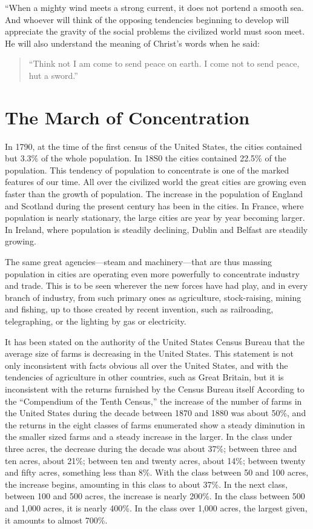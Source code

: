 \documentclass{book}
\begin{document}
“When a mighty wind meets a strong current, it does not portend a smooth sea. And whoever will think of the opposing tendencies beginning to develop will appreciate the gravity of the social problems the civilized world must soon meet. He will also understand the meaning of Christ’s words when he said:

\begin{quotation}
	“Think not I am come to send peace on earth. I come not to send peace, hut a sword.”
\end{quotation}

\chapter{The March of Concentration}
\label{chapter-5}
In 1790, at the time of the first census of the United States, the cities contained but 3.3\% of the whole population. In 18S0 the cities contained 22.5\% of the population. This tendency of population to concentrate is one of the marked features of our time. All over the civilized world the great cities are growing even faster than the growth of population. The increase in the population of England and Scotland during the present century has been in the cities. In France, where population is nearly stationary, the large cities are year by year becoming larger. In Ireland, where population is steadily declining, Dublin and Belfast are steadily growing.

The same great agencies—steam and machinery—that are thus massing population in cities are operating even more powerfully to concentrate industry and trade. This is to be seen wherever the new forces have had play, and in every branch of industry, from such primary ones as agriculture, stock-raising, mining and fishing, up to those created by recent invention, such as railroading, telegraphing, or the lighting by gas or electricity.

It has been stated on the authority of the United States Census Bureau that the average size of farms is decreasing in the United States. This statement is not only inconsistent with facts obvious all over the United States, and with the tendencies of agriculture in other countries, such as Great Britain, but it is inconsistent with the returns furnished by the Census Bureau itself According to the “Compendium of the Tenth Census,” the increase of the number of farms in the United States during the decade between 1870 and 1880 was about 50\%, and the returns in the eight classes of farms enumerated show a steady diminution in the smaller sized farms and a steady increase in the larger. In the class under three acres, the decrease during the decade was about 37\%; between three and ten acres, about 21\%; between ten and twenty acres, about 14\%; between twenty and fifty acres, something less than 8\%. With the class between 50 and 100 acres, the increase begins, amounting in this class to about 37\%. In the next class, between 100 and 500 acres, the increase is nearly 200\%. In the class between 500 and 1,000 acres, it is nearly 400\%. In the class over 1,000 acres, the largest given, it amounts to almost 700\%.
\end{document}
